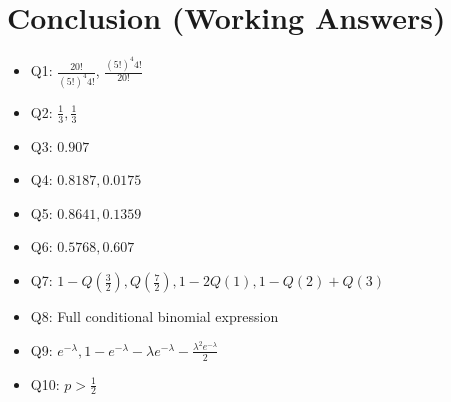 \documentclass[12pt]{article}
\begin{document}
\section*{Conclusion (Working Answers)}

\begin{itemize}
\item Q1: $\frac{20!}{(5!)^4 4!}$, \quad $\frac{(5!)^4 4!}{20!}$
\item Q2: $\frac13, \frac13$
\item Q3: $0.907$
\item Q4: $0.8187, 0.0175$
\item Q5: $0.8641, 0.1359$
\item Q6: $0.5768, 0.607$
\item Q7: $1-Q\left(\frac32\right), Q\left(\frac72\right), 1-2Q(1), 1-Q(2)+Q(3)$
\item Q8: Full conditional binomial expression
\item Q9: $e^{-\lambda}, 1-e^{-\lambda}-\lambda e^{-\lambda}-\frac{\lambda^2 e^{-\lambda}}{2}$
\item Q10: $p>\frac12$
\end{itemize}
\end{document}

